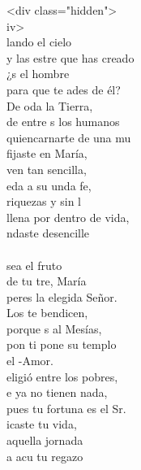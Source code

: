 \begin{cancion}%
<div class="hidden">\\
	iv>\\
	lando el cielo \\
	y las estre que has creado\\
	¿s el hombre  \\
	para que te ades de él?\\
	De oda la Tierra, \\
	de entre s los humanos\\
	quiencarnarte de una mu\\
	fijaste en María, \\
	ven tan sencilla,\\
	eda a su unda fe,\\
	 riquezas y sin l\\
llena por dentro de vida,\\
	ndaste desencille  \\
\jump\\
	 sea el fruto \\
	de tu tre, María\\
	peres la elegida Señor.\\
	Los  te bendicen, \\
	porque s al Mesías,\\
	pon ti pone su templo \\
	el -Amor.\\
	eligió entre los pobres, \\
	e ya no tienen nada,\\
	pues tu  fortuna es el Sr.\\
	icaste tu vida, \\
	aquella jornada\\
	a acu tu regazo \\

\end{cancion}
